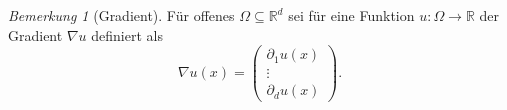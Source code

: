 \documentclass{scrartcl}
\newcommand{\reals}{\mathbb{R}}
\theoremstyle{remark}
\newtheorem {remark} {Bemerkung}
\begin{document}

  \begin{remark}[Gradient]
    Für offenes $\Omega \subseteq \reals^d$ sei für eine Funktion $u \colon \Omega \to \reals$ der Gradient $\nabla u$ definiert als
    \begin{equation}
      \nabla u (x) =
      \begin{pmatrix} %
        \partial_1 u(x) \\
        \vdots \\
        \partial_d u(x)
      \end{pmatrix}.
    \end{equation}
  \end{remark}
\end{document}

